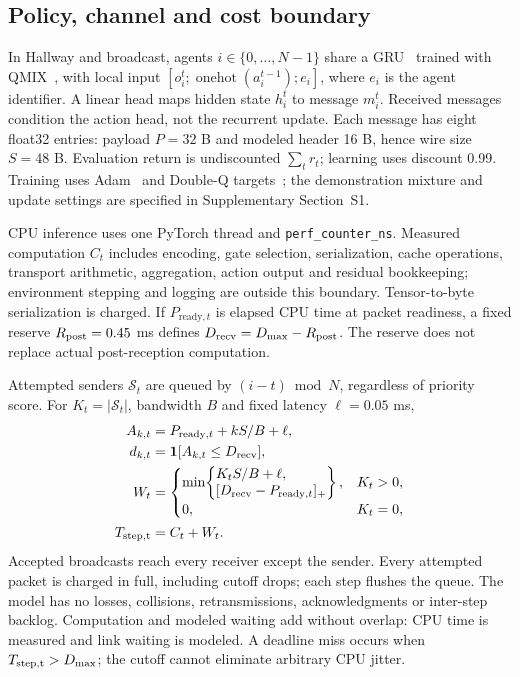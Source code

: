 \documentclass[a4paper,fleqn]{cas-dc}
\newcommand{\ind}{\mathbf{1}}
\begin{document}
\subsection{Policy, channel and cost boundary}
In Hallway and broadcast, agents $i\in\{0,\ldots,N-1\}$ share a GRU~\citep{cho2014learning} trained with QMIX~\citep{rashid2018qmix}, with local input $[o_i^t;\operatorname{onehot}(a_i^{t-1});e_i]$, where $e_i$ is the agent identifier. A linear head maps hidden state $h_i^t$ to message $m_i^t$. Received messages condition the action head, not the recurrent update. Each message has eight float32 entries: payload $P=32$ B and modeled header 16 B, hence wire size $S=48$ B. Evaluation return is undiscounted $\sum_t r_t$; learning uses discount 0.99. Training uses Adam~\citep{kingma2015adam} and Double-Q targets~\citep{hasselt2016deepdouble}; the demonstration mixture and update settings are specified in Supplementary Section~S1.

CPU inference uses one PyTorch thread and \texttt{perf\_counter\_ns}. Measured computation $C_t$ includes encoding, gate selection, serialization, cache operations, transport arithmetic, aggregation, action output and residual bookkeeping; environment stepping and logging are outside this boundary. Tensor-to-byte serialization is charged. If $P_{\mathrm{ready},t}$ is elapsed CPU time at packet readiness, a fixed reserve $R_{\rm post}=0.45$ ms defines $D_{\rm recv}=D_{\max}-R_{\rm post}$. The reserve does not replace actual post-reception computation.

Attempted senders $\mathcal S_t$ are queued by $(i-t)\bmod N$, regardless of priority score. For $K_t=|\mathcal S_t|$, bandwidth $B$ and fixed latency $\ell=0.05$ ms,
\begingroup
\setlength{\mathindent}{0pt}
\begin{align}
 A_{k,t}&=P_{\mathrm{ready},t}+kS/B+\ell,\nonumber\\ d_{k,t}&=\ind[A_{k,t}\le D_{\rm recv}],\\
 W_t&=\begin{cases}\min\!\left\{\begin{aligned}&K_tS/B+\ell,\\&[D_{\rm recv}-P_{\mathrm{ready},t}]_+\end{aligned}\right\},&K_t>0,\\0,&K_t=0,\end{cases}\\
 T_{\rm step,t}&=C_t+W_t.\label{eq:step}
\end{align}
\endgroup
Accepted broadcasts reach every receiver except the sender. Every attempted packet is charged in full, including cutoff drops; each step flushes the queue. The model has no losses, collisions, retransmissions, acknowledgments or inter-step backlog. Computation and modeled waiting add without overlap: CPU time is measured and link waiting is modeled. A deadline miss occurs when $T_{\rm step,t}>D_{\max}$; the cutoff cannot eliminate arbitrary CPU jitter.
\end{document}
